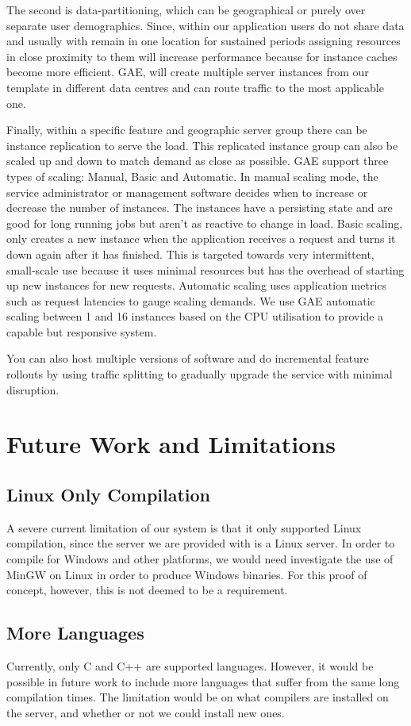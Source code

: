 \documentclass[conference]{IEEEtran}
\begin{document}
The second is data-partitioning, which can be geographical or purely over separate user demographics. Since, within our application users do not share data and usually with remain in one location for sustained periods assigning resources in close proximity to them will increase performance because for instance caches become more efficient. GAE, will create multiple server instances from our template in different data centres and can route traffic to the most applicable one. 

Finally, within a specific feature and geographic server group there can be instance replication to serve the load. This replicated instance group can also be scaled up and down to match demand as close as possible. GAE support three types of scaling: Manual, Basic and Automatic. In manual scaling mode, the service administrator or management software decides when to increase or decrease the number of instances. The instances have a persisting state and are good for long running jobs but aren't as reactive to change in load. Basic scaling, only creates a new instance when the application receives a request and turns it down again after it has finished. This is targeted towards very intermittent, small-scale use because it uses minimal resources but has the overhead of starting up new instances for new requests. Automatic scaling uses application metrics such as request latencies to gauge scaling demands. We use GAE automatic scaling between 1 and 16 instances based on the CPU utilisation to provide a capable but responsive system. 

You can also host multiple versions of software and do incremental feature rollouts by using traffic splitting to gradually upgrade the service with minimal disruption.


\section{Future Work and Limitations}
\subsection{Linux Only Compilation}
A severe current limitation of our system is that it only supported Linux
compilation, since the server we are provided with is a Linux server. In order
to compile for Windows and other platforms, we would need investigate the use of
MinGW on Linux in order to produce Windows binaries. For this proof of concept,
however, this is not deemed to be a requirement.
\subsection{More Languages}
Currently, only C and C++ are supported languages. However, it would be possible
in future work to include more languages that suffer from the same long
compilation times. The limitation would be on what compilers are installed on
the server, and whether or not we could install new ones.
\end{document}
